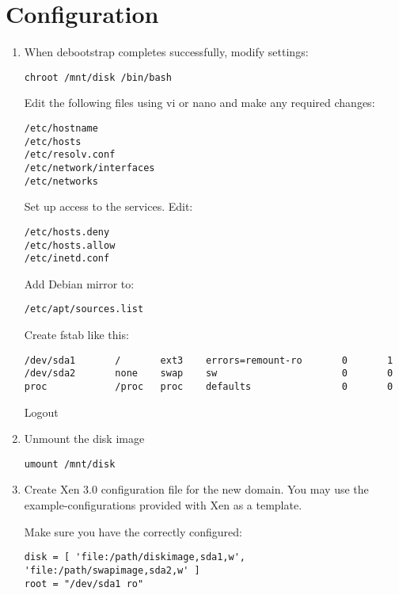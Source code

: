 \section{Configuration}
\begin{enumerate}
\item When debootstrap completes successfully, modify settings:
\begin{verbatim}
chroot /mnt/disk /bin/bash
\end{verbatim}

  Edit the following files using vi or nano and make any required
  changes:
\begin{verbatim}
/etc/hostname
/etc/hosts
/etc/resolv.conf
/etc/network/interfaces
/etc/networks
\end{verbatim}

  Set up access to the services. Edit:
\begin{verbatim}
/etc/hosts.deny
/etc/hosts.allow
/etc/inetd.conf
\end{verbatim}

  Add Debian mirror to:
\begin{verbatim}
/etc/apt/sources.list
\end{verbatim}

  Create fstab like this:
\begin{verbatim}
/dev/sda1       /       ext3    errors=remount-ro       0       1
/dev/sda2       none    swap    sw                      0       0
proc            /proc   proc    defaults                0       0
\end{verbatim}

  Logout

\item Unmount the disk image
\begin{verbatim}
umount /mnt/disk
\end{verbatim}

\item Create Xen 3.0 configuration file for the new domain. You may use
  the example-configurations provided with Xen as a template.

  Make sure you have the correctly configured:
\begin{verbatim}
disk = [ 'file:/path/diskimage,sda1,w', 'file:/path/swapimage,sda2,w' ]
root = "/dev/sda1 ro"
\end{verbatim}
\end{enumerate}

